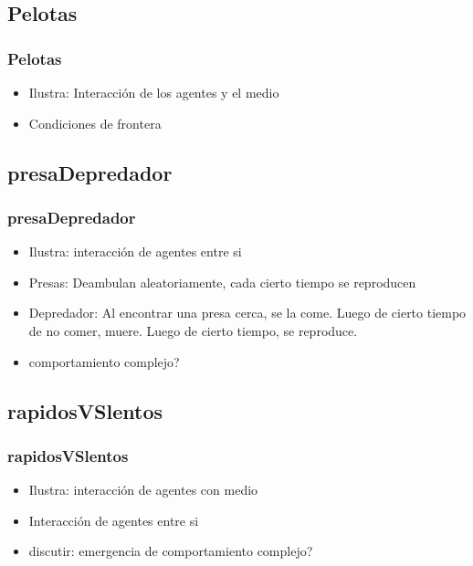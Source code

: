 \documentclass{beamer}
\begin{document}
\subsection{Pelotas}
\begin{frame}[t]
\frametitle{Pelotas}
\begin{itemize}[<+-| alert@+>]
	\item Ilustra: Interacción de los agentes y el medio
	\item Condiciones de frontera
\end{itemize}
\end{frame}

\subsection{presaDepredador}
\begin{frame}[t]
\frametitle{presaDepredador}
\begin{itemize}[<+-| alert@+>]
	\item Ilustra: interacción de agentes entre si
	\item Presas: Deambulan aleatoriamente, cada cierto tiempo se reproducen
	\item Depredador: Al encontrar una presa cerca, se la come. Luego de cierto tiempo de no comer, muere. Luego de cierto tiempo, se reproduce.
	\item comportamiento complejo?
\end{itemize}
\end{frame}

\subsection{rapidosVSlentos}
\begin{frame}[t]
\frametitle{rapidosVSlentos}
\begin{itemize}[<+-| alert@+>]
	\item Ilustra: interacción de agentes con medio
	\item Interacción de agentes entre si
	\item discutir: emergencia de comportamiento complejo?
\end{itemize}
\end{frame}
\end{document}
